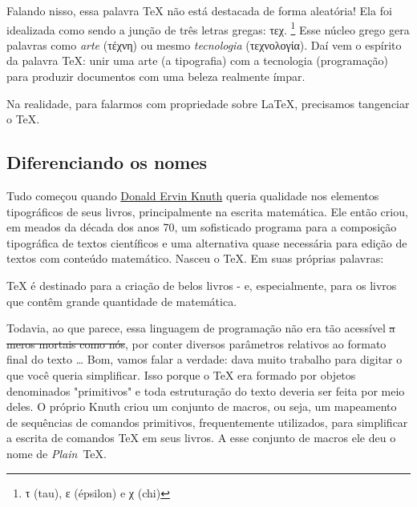 
Falando nisso, essa palavra \TeX{} não está destacada de forma aleatória! 
Ela foi idealizada como sendo a junção de três letras gregas: \foreignlanguage{greek}{τεχ}.
\footnote{%
\foreignlanguage{greek}{τ} (tau), \foreignlanguage{greek}{ε} (épsilon) e \foreignlanguage{greek}{χ} (chi)
}
Esse núcleo grego gera palavras como \textit{arte} (\foreignlanguage{greek}{τέχνη}) 
ou mesmo \textit{tecnologia} (\foreignlanguage{greek}{τεχνολογία}).
Daí vem o espírito da palavra \TeX: unir uma arte (a tipografia) com a tecnologia 
(programação) para produzir documentos com uma beleza realmente ímpar.

Na realidade, para falarmos com propriedade sobre \LaTeX, precisamos tangenciar 
o \TeX.

\subsection{Diferenciando os nomes} %

Tudo começou quando \href{https://pt.wikipedia.org/wiki/Donald_Knuth}{Donald Ervin Knuth} 
queria qualidade nos elementos tipográficos de seus livros, principalmente na 
escrita matemática. 
Ele então criou, em meados da década dos anos 70, um sofisticado programa para a 
composição tipográfica de textos científicos e uma alternativa quase necessária 
para edição de textos com conteúdo matemático. 
Nasceu o \TeX. 
Em suas próprias palavras:

\begin{cita}
  \TeX{} é destinado para a criação de belos livros - e, especialmente, para os 
  livros que contêm grande quantidade de matemática.
\end{cita}

Todavia, ao que parece, essa linguagem de programação não era tão acessível 
\sout{a meros mortais como nós}, por conter diversos parâmetros relativos ao 
formato final do texto \ldots
Bom, vamos falar a verdade: dava muito trabalho para digitar o que você queria 
simplificar.
Isso porque o \TeX{} era formado por objetos denominados "primitivos" e toda 
estruturação do texto deveria ser feita por meio deles.
O próprio Knuth criou um conjunto de macros, ou seja, um mapeamento de sequências de comandos primitivos, frequentemente 
utilizados, para simplificar a escrita de comandos \TeX{} em seus livros.
A esse conjunto de macros ele deu o nome de \textit{Plain}~\TeX.

